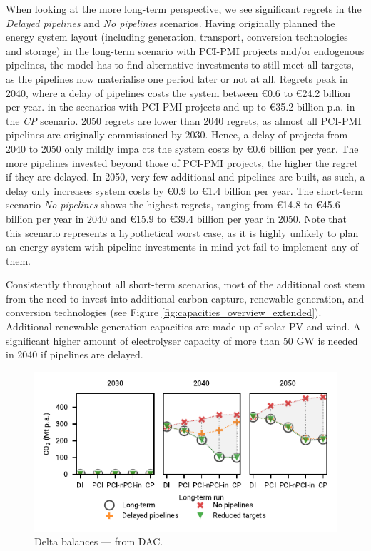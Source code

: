\documentclass[preprint,12pt,sort&compress]{elsarticle}
\begin{document}
When looking at the more long-term perspective, we see significant regrets in the \textit{Delayed pipelines} and \textit{No pipelines} scenarios. Having originally planned the energy system layout (including generation, transport, conversion technologies and storage) in the long-term scenario with PCI-PMI projects and/or endogenous pipelines, the model has to find alternative investments to still meet all targets, as the pipelines now materialise one period later or not at all. Regrets peak in 2040, where a delay of pipelines costs the system between \euro{0.6} to \euro{24.2} billion per year. in the scenarios with PCI-PMI projects and up to \euro{35.2} billion p.a. in the \textit{CP} scenario. 2050 regrets are lower than 2040 regrets, as almost all PCI-PMI pipelines are originally commissioned by 2030. Hence, a delay of projects from 2040 to 2050 only mildly impa
cts the system costs by \euro{0.6} billion per year. The more pipelines invested beyond those of PCI-PMI projects, the higher the regret if they are delayed. In 2050, very few additional  and  pipelines are built, as such, a delay only increases system costs by \euro{0.9} to \euro{1.4} billion per year. 
The short-term scenario \textit{No pipelines} shows the highest regrets, ranging from \euro{14.8} to \euro{45.6} billion per year in 2040 and \euro{15.9} to \euro{39.4} billion per year in 2050. Note that this scenario represents a hypothetical worst case, as it is highly unlikely to plan an energy system with pipeline investments in mind yet fail to implement any of them.

Consistently throughout all short-term scenarios, most of the additional cost stem from the need to invest into additional carbon capture, renewable generation, and conversion technologies (see Figure \ref{fig:capacities_overview_extended}). Additional renewable generation capacities are made up of solar PV and wind. A significant higher amount of electrolyser capacity of more than 50 GW is needed in 2040 if pipelines are delayed. 

\begin{figure}[htbp]
  \centering
  \includegraphics{delta_balances_DAC}
  \caption{Delta balances ---  from DAC.}
  \label{fig:delta_balances_dac}
\end{figure}
\end{document}
